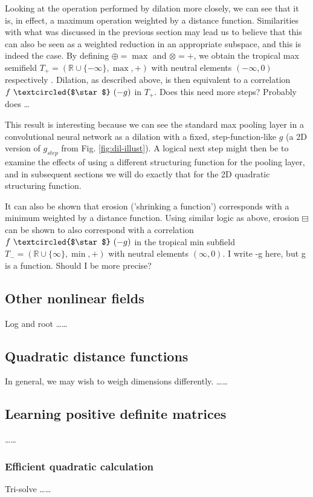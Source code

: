 \documentclass[11pt]{article} %
\def\comment#1{\color{red}#1\color{black}}
\begin{document}
Looking at the operation performed by dilation more closely, we can see that it is, in effect, a maximum operation weighted by a distance function. Similarities with what was discussed in the previous section may lead us to believe that this can also be seen as a weighted reduction in an appropriate subspace, and this is indeed the case. By defining $\oplus=\max$ and $\otimes=+$, we obtain the tropical max semifield $T_+=(\mathbb{R}\cup\{-\infty\},\max,+)$ with neutral elements $(-\infty, 0)$ respectively \cite{bellaardaxiomatic}. Dilation, as described above, is then equivalent to a correlation $f ~\textcircled{$\star$}~ (-g)$ in $T_+$. \comment{Does this need more steps? Probably does \ldots}

This result is interesting because we can see the standard max pooling layer in a convolutional neural network as a dilation with a fixed, step-function-like $g$ (a 2D version of $g_{step}$ from Fig. \ref{fig:dil-illust}). A logical next step might then be to examine the effects of using a different structuring function for the pooling layer, and in subsequent sections we will do exactly that for the 2D quadratic structuring function.

It can also be shown that erosion ('shrinking a function') corresponds with a minimum weighted by a distance function. Using similar logic as above, erosion $\boxminus$ can be shown to also correspond with a correlation $f ~\textcircled{$\star$}~ (-g)$ in the tropical min subfield $T_-=(\mathbb{R}\cup\{\infty\},\min,+)$ with neutral elements $(\infty, 0)$. \comment{I write -g here, but g is a function. Should I be more precise?}

\subsection{Other nonlinear fields}
Log and root \cite{bellaardaxiomatic} \comment{\ldots\ldots}

\subsection{Quadratic distance functions}
In general, we may wish to weigh dimensions differently. \comment{\ldots\ldots}


\subsection{Learning positive definite matrices}
\comment{\ldots\ldots}

\subsubsection{Efficient quadratic calculation}
Tri-solve \comment{\ldots\ldots}



\end{document}
